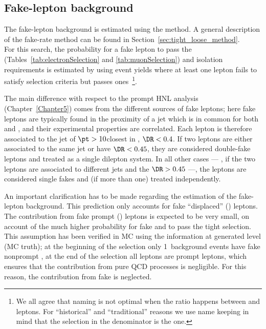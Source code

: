 \subsection{Fake-lepton background}\label{sec_llfakelepton}
The fake-lepton background is estimated using the \ttol
method.
A general description of the fake-rate method can be found in
Section~\ref{sec:tight_loose_method}.\\
For this search, the probability for 
a fake lepton to pass the \tD (Tables~\ref{tab:electronSelection} and \ref{tab:muonSelection}) and isolation requirements is estimated by using event yields where at least one lepton fails to satisfy \tD 
selection criteria but passes
\fo ones~\footnote{We all agree that \ttol naming is not optimal when the
  ratio happens between \tD and \fo leptons. For ``historical'' and ``traditional''
  reasons we use \ttol name keeping in mind that the selection in the
  denominator is the \fo one.}.

The main difference with respect to the prompt HNL analysis
(Chapter~\ref{Chapter5}) comes from the different sources of fake
leptons; here fake leptons are typically found in the proximity of a
jet which is in common for both \ltwo and \lthree, and their
experimental properties are correlated. Each \fo
lepton is therefore associated to the jet of $\pt>10$\GeV closest in
\DR, \ie $\DR<0.4$.
If two \fo leptons 
are either associated to the same jet or have $\DR<0.45$, they are considered double-fake
leptons and treated as a single dilepton system.
In all other cases --- \ie, if the two \fo leptons are associated to
different jets and the $\DR>0.45$ ---,
the \fo leptons are considered single fakes and (if more than one)
treated independently.

An important clarification has to be made regarding the estimation of 
the fake-lepton background. This prediction only accounts for 
fake ``displaced''  (\ltwothree) leptons. The contribution from
fake prompt (\ie \lone) leptons is expected to be very small, on
account of the much higher probability for fake \ltwo and \lthree to
pass the tight \displ selection. This assumption has been verified in
MC using the information at generated level (MC truth); at the
beginning of the selection only 1\textperthousand\ background
events have fake nonprompt \lone, at the end of the selection all \lone
leptons are prompt leptons, which ensures that the contribution from
pure QCD processes is negligible. 
For this reason, the contribution from fake \lone is neglected.

